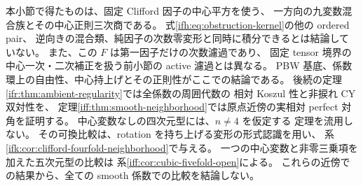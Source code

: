 \begin{remark}[この積分族の範囲]
\label{ifc:rem:scope}
本小節で得たものは、固定 Clifford 因子の中心平方を使う、
一方向の九変数混合族とその中心正則三次商である。
式\eqref{ifh:eq:obstruction-kernel}の他の ordered pair、
逆向きの混合類、純因子の次数零変形と同時に積分できるとは結論していない。
また、この $F$ は第一因子だけの次数濾過であり、
固定 tensor 境界の中心一次・二次補正を扱う前小節の active 濾過とは異なる。
PBW 基底、係数環上の自由性、中心持上げとその正則性がここでの結論である。
後続の定理\ref{ifr:thm:ambient-regularity}では全係数の周囲代数の
相対 Koszul 性と非捩れ CY 双対性を、
定理\ref{iff:thm:smooth-neighborhood}では原点近傍の実相対 perfect 対角を証明する。
中心変数なしの四次元型には、$n\ne4$ を仮定する
定理を流用しない。
その可換比較は、rotation を持ち上げる変形の形式認識を用い、
系\ref{ifk:cor:clifford-fourfold-neighborhood}で与える。
一つの中心変数と非零三乗項を加えた五次元型の比較は
系\ref{iff:cor:cubic-fivefold-open}による。
これらの近傍での結果から、全ての smooth 係数での比較を結論しない。
\end{remark}
